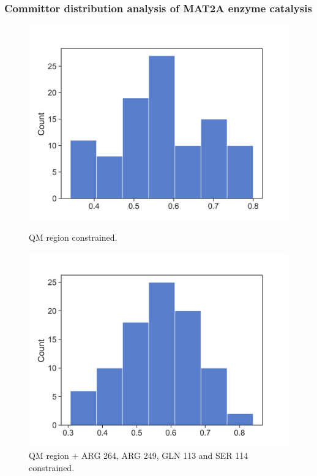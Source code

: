 \documentclass[a4paper,8pt]{beamer}
\begin{document}
%
\begin{frame}
\frametitle{Committor distribution analysis of MAT2A enzyme catalysis}
    \begin{figure}[ht]
        \begin{minipage}[b]{0.45\linewidth}
            \centering
            \includegraphics[width=\textwidth]{figures/40.png}
            \caption{QM region constrained.}
            \label{fig:a}
        \end{minipage}
        \hspace{0.5cm}
        \begin{minipage}[b]{0.45\linewidth}
            \centering
            \includegraphics[width=\textwidth]{figures/cons_40.png}
            \caption{QM region $+$ ARG 264, ARG 249, GLN 113 and SER 114 constrained.}
            \label{fig:b}
        \end{minipage}
    \end{figure}
\end{frame}
\end{document}

